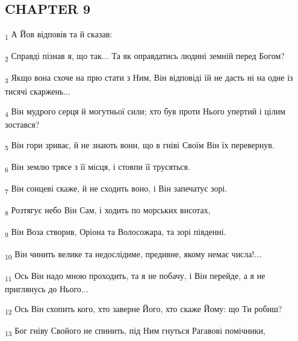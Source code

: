 \subsection{CHAPTER 9}
\begin{tcolorbox}
\textsubscript{1} А Йов відповів та й сказав:
\end{tcolorbox}
\begin{tcolorbox}
\textsubscript{2} Справді пізнав я, що так... Та як оправдатись людині земній перед Богом?
\end{tcolorbox}
\begin{tcolorbox}
\textsubscript{3} Якщо вона схоче на прю стати з Ним, Він відповіді їй не дасть ні на одне із тисячі скаржень...
\end{tcolorbox}
\begin{tcolorbox}
\textsubscript{4} Він мудрого серця й могутньої сили; хто був проти Нього упертий і цілим зостався?
\end{tcolorbox}
\begin{tcolorbox}
\textsubscript{5} Він гори зриває, й не знають вони, що в гніві Своїм Він їх перевернув.
\end{tcolorbox}
\begin{tcolorbox}
\textsubscript{6} Він землю трясе з її місця, і стовпи її трусяться.
\end{tcolorbox}
\begin{tcolorbox}
\textsubscript{7} Він сонцеві скаже, й не сходить воно, і Він запечатує зорі.
\end{tcolorbox}
\begin{tcolorbox}
\textsubscript{8} Розтягує небо Він Сам, і ходить по морських висотах,
\end{tcolorbox}
\begin{tcolorbox}
\textsubscript{9} Він Воза створив, Оріона та Волосожара, та зорі південні.
\end{tcolorbox}
\begin{tcolorbox}
\textsubscript{10} Він чинить велике та недослідиме, предивне, якому немає числа!...
\end{tcolorbox}
\begin{tcolorbox}
\textsubscript{11} Ось Він надо мною проходить, та я не побачу, і Він перейде, а я не приглянусь до Нього...
\end{tcolorbox}
\begin{tcolorbox}
\textsubscript{12} Ось Він схопить кого, хто заверне Його, хто скаже Йому: що Ти робиш?
\end{tcolorbox}
\begin{tcolorbox}
\textsubscript{13} Бог гніву Свойого не спинить, під Ним гнуться Рагавові помічники,
\end{tcolorbox}
